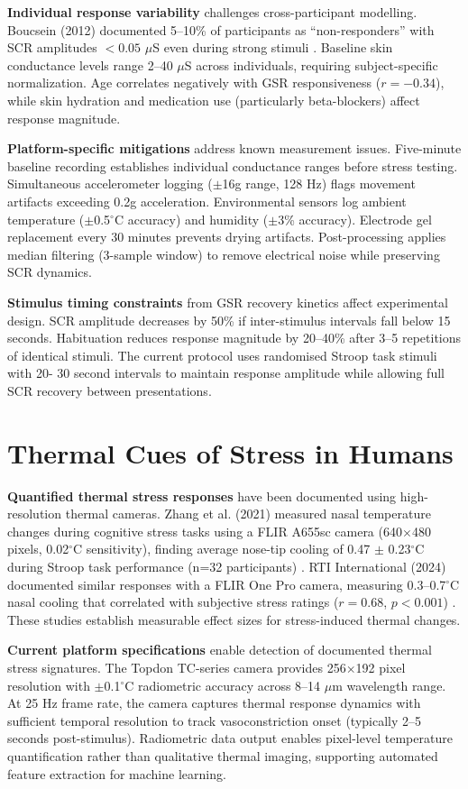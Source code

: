 \textbf{Individual response variability} challenges cross-participant modelling. Boucsein (2012) documented 5--10\% of participants as ``non-responders'' with SCR amplitudes $<0.05$ $\mu$S even during strong stimuli \cite{ref1}. Baseline skin conductance levels range 2--40 $\mu$S across individuals, requiring subject-specific normalization. Age correlates negatively with GSR responsiveness ($r = -0.34$), while skin hydration and medication use (particularly beta-blockers) affect response magnitude.

\textbf{Platform-specific mitigations} address known measurement issues. Five-minute baseline recording establishes individual conductance ranges before stress testing. Simultaneous accelerometer logging ($\pm$16g range, 128 Hz) flags movement artifacts exceeding 0.2g acceleration. Environmental sensors log ambient temperature ($\pm$0.5$^\circ$C accuracy) and humidity ($\pm$3\% accuracy). Electrode gel replacement every 30 minutes prevents drying artifacts. Post-processing applies median filtering (3-sample window) to remove electrical noise while preserving SCR dynamics.

\textbf{Stimulus timing constraints} from GSR recovery kinetics affect experimental design. SCR amplitude decreases by 50\% if inter-stimulus intervals fall below 15 seconds. Habituation reduces response magnitude by 20--40\% after 3--5 repetitions of identical stimuli. The current protocol uses randomised Stroop task stimuli with 20- 30 second intervals to maintain response amplitude while allowing full SCR recovery between presentations.


\section{Thermal Cues of Stress in Humans}
\textbf{Quantified thermal stress responses} have been documented using high-resolution thermal cameras. Zhang et al. (2021) measured nasal temperature changes during cognitive stress tasks using a FLIR A655sc camera (640$\times$480 pixels, 0.02$^\circ$C sensitivity), finding average nose-tip cooling of 0.47 $\pm$ 0.23$^\circ$C during Stroop task performance (n=32 participants) \cite{ref5}. RTI International (2024) documented similar responses with a FLIR One Pro camera, measuring 0.3--0.7$^\circ$C nasal cooling that correlated with subjective stress ratings ($r = 0.68$, $p < 0.001$) \cite{ref6}. These studies establish measurable effect sizes for stress-induced thermal changes.

\textbf{Current platform specifications} enable detection of documented thermal stress signatures. The Topdon TC-series camera provides 256$\times$192 pixel resolution with $\pm$0.1$^\circ$C radiometric accuracy across 8--14 $\mu$m wavelength range. At 25 Hz frame rate, the camera captures thermal response dynamics with sufficient temporal resolution to track vasoconstriction onset (typically 2--5 seconds post-stimulus). Radiometric data output enables pixel-level temperature quantification rather than qualitative thermal imaging, supporting automated feature extraction for machine learning.

